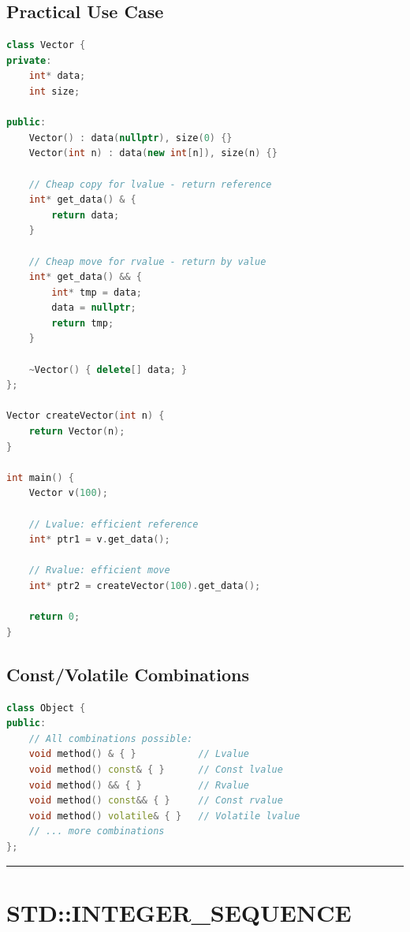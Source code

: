 \hypertarget{practical-use-case}{%
\subsection{Practical Use Case}\label{practical-use-case}}

\begin{lstlisting}[language={C++}]
class Vector {
private:
    int* data;
    int size;

public:
    Vector() : data(nullptr), size(0) {}
    Vector(int n) : data(new int[n]), size(n) {}

    // Cheap copy for lvalue - return reference
    int* get_data() & {
        return data;
    }

    // Cheap move for rvalue - return by value
    int* get_data() && {
        int* tmp = data;
        data = nullptr;
        return tmp;
    }

    ~Vector() { delete[] data; }
};

Vector createVector(int n) {
    return Vector(n);
}

int main() {
    Vector v(100);
    
    // Lvalue: efficient reference
    int* ptr1 = v.get_data();
    
    // Rvalue: efficient move
    int* ptr2 = createVector(100).get_data();
    
    return 0;
}
\end{lstlisting}

\hypertarget{constvolatile-combinations}{%
\subsection{Const/Volatile
Combinations}\label{constvolatile-combinations}}

\begin{lstlisting}[language={C++}]
class Object {
public:
    // All combinations possible:
    void method() & { }           // Lvalue
    void method() const& { }      // Const lvalue
    void method() && { }          // Rvalue
    void method() const&& { }     // Const rvalue
    void method() volatile& { }   // Volatile lvalue
    // ... more combinations
};
\end{lstlisting}

\begin{center}\rule{0.5\linewidth}{0.5pt}\end{center}

\hypertarget{stdinteger_sequence}{%
\section{STD::INTEGER\_SEQUENCE}\label{stdinteger_sequence}}

